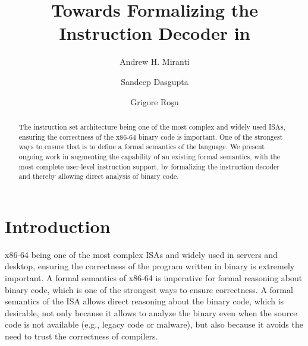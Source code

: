 \documentclass[a4paper,UKenglish,cleveref, autoref]{lipics-v2019}
\title{Towards Formalizing the \ISA Instruction Decoder in \K} %
\author{Andrew H. Miranti}{University of Illinois at Urbana Champaign, USA}{miranti2@illinois.edu}{}{}
\author{Sandeep Dasgupta}{University of Illinois at Urbana Champaign, USA }{sdasgup3@illinois.edu}{}{}
\author{Grigore Ro\c{s}u}{University of Illinois at Urbana Champaign, USA}{grosu@illinois.edu}{}{}
\begin{document}
\maketitle

\begin{abstract}
    The \ISA instruction set architecture being one of the
    most complex and widely used ISAs,  ensuring the correctness of the x86-64 binary code is
    important. One of the strongest ways to ensure that is to define a  formal semantics of the \ISA language. We present ongoing work in augmenting the capability of an existing \ISA formal semantics, with the most complete user-level instruction support, by formalizing the instruction decoder and thereby allowing direct analysis of binary code.
\end{abstract}

\section{Introduction}
\label{sec:intro}
x86-64 being one of the most complex ISAs and widely used in servers and
desktop, ensuring the correctness of the program written in binary is extremely
important. A formal semantics of x86-64 is imperative for formal reasoning
about binary code, which is  one of the strongest ways to ensure
correctness. A formal semantics of the ISA allows direct reasoning about the
binary code, which is desirable, not only because it allows to analyze the
binary even when the source code is not available (e.g., legacy code or
    malware), but also because it avoids the need to trust the correctness of
compilers.

%
\end{document}

